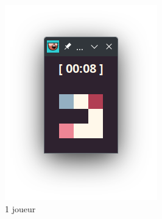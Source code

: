\begin{figure}[!htb]
    \begin{subfigure}[b]{0.2\textwidth}
        \includegraphics[width=\textwidth]{ressources/Implementation/Labyrinthe/Vue/Players/1Player.png}
        \caption{1 joueur}
    \end{subfigure}
    \hfill
    \begin{subfigure}[b]{0.2\textwidth}

\end{subfigure}
\end{figure}
